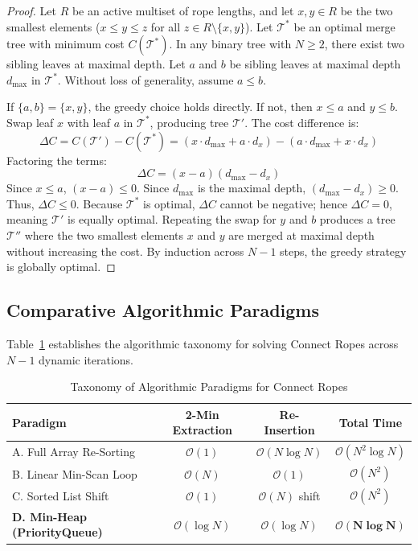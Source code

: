\documentclass[10pt,twocolumn,letterpaper]{article}
\begin{document}
\begin{proof}
Let $R$ be an active multiset of rope lengths, and let $x, y \in R$ be the two smallest elements ($x \le y \le z$ for all $z \in R \setminus \{x, y\}$). Let $\mathcal{T}^*$ be an optimal merge tree with minimum cost $C(\mathcal{T}^*)$. In any binary tree with $N \ge 2$, there exist two sibling leaves at maximal depth. Let $a$ and $b$ be sibling leaves at maximal depth $d_{\max}$ in $\mathcal{T}^*$. Without loss of generality, assume $a \le b$. 

If $\{a, b\} = \{x, y\}$, the greedy choice holds directly. If not, then $x \le a$ and $y \le b$. Swap leaf $x$ with leaf $a$ in $\mathcal{T}^*$, producing tree $\mathcal{T}'$. The cost difference is:
\begin{equation}
\Delta C = C(\mathcal{T}') - C(\mathcal{T}^*) = (x \cdot d_{\max} + a \cdot d_x) - (a \cdot d_{\max} + x \cdot d_x)
\end{equation}
Factoring the terms:
\begin{equation}
\Delta C = (x - a)(d_{\max} - d_x)
\end{equation}
Since $x \le a$, $(x - a) \le 0$. Since $d_{\max}$ is the maximal depth, $(d_{\max} - d_x) \ge 0$. Thus, $\Delta C \le 0$. Because $\mathcal{T}^*$ is optimal, $\Delta C$ cannot be negative; hence $\Delta C = 0$, meaning $\mathcal{T}'$ is equally optimal. Repeating the swap for $y$ and $b$ produces a tree $\mathcal{T}''$ where the two smallest elements $x$ and $y$ are merged at maximal depth without increasing the cost. By induction across $N-1$ steps, the greedy strategy is globally optimal.
\end{proof}

\subsection{Comparative Algorithmic Paradigms}
Table~\ref{tab:ropes-paradigms} establishes the algorithmic taxonomy for solving Connect Ropes across $N-1$ dynamic iterations.

\begin{table}[htbp]
\centering
\caption{Taxonomy of Algorithmic Paradigms for Connect Ropes}
\label{tab:ropes-paradigms}
\begin{tabular}{lccc}
\toprule
\textbf{Paradigm} & \textbf{2-Min Extraction} & \textbf{Re-Insertion} & \textbf{Total Time} \\
\midrule
A. Full Array Re-Sorting & $\mathcal{O}(1)$ & $\mathcal{O}(N \log N)$ & $\mathcal{O}(N^2 \log N)$ \\
B. Linear Min-Scan Loop & $\mathcal{O}(N)$ & $\mathcal{O}(1)$ & $\mathcal{O}(N^2)$ \\
C. Sorted List Shift & $\mathcal{O}(1)$ & $\mathcal{O}(N)$ shift & $\mathcal{O}(N^2)$ \\
\textbf{D. Min-Heap (PriorityQueue)} & $\mathcal{O}(\log N)$ & $\mathcal{O}(\log N)$ & $\mathbf{\mathcal{O}(N \log N)}$ \\
\bottomrule
\end{tabular}
\end{table}
\end{document}

